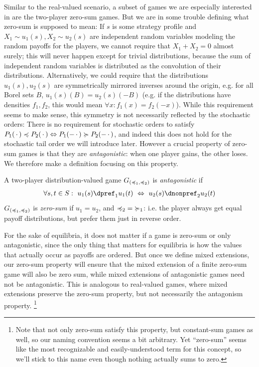 \documentclass[a4paper]{scrreprt}
\begin{document}
    Similar to the real-valued scenario, a subset of games we are especially interested in are the two-player zero-sum games.
    But we are in some trouble defining what zero-sum is supposed to mean: If $s$ is some strategy profile and $X_1 \sim u_1(s), X_2 \sim u_2(s)$ are independent random variables modeling the random payoffs for the players, we cannot require that $X_1 + X_2 = 0$ almost surely; this will never happen except for trivial distributions, because the sum of independent random variables is distributed as the convolution of their distributions.
    Alternatively, we could require that the distributions $u_1(s), u_2(s)$ are symmetrically mirrored inverses around the origin, e.g. for all Borel sets $B$, $u_1(s)(B) = u_2(s)(-B)$ (e.g. 
    if the distributions have densities $f_1, f_2$, this would mean $\forall x: f_1(x) = f_2(-x)$).
    While this requirement seems to make sense, this symmetry is not necessarily reflected by the stochastic orders: There is no requirement for stochastic orders to satisfy $P_1(\,\cdot\,) \preccurlyeq P_2(\,\cdot\,) \Leftrightarrow P_1(-\,\cdot\,) \succcurlyeq P_2(-\,\cdot\,)$, and indeed this does not hold for the stochastic tail order we will introduce later.
    However a crucial property of zero-sum games is that they are \emph{antagonistic}: 
    when one player gains, the other loses. We therefore make a definition focusing on this property.
    \begin{defn}
        A two-player distribution-valued game $G_{(\preccurlyeq_1, \preccurlyeq_2)}$ is \emph{antagonistic} if
        \begin{gather*}
            \forall s, t \in S:~ u_1(s) \dpref_1 u_1(t) ~\lra~ u_2(s) \dnonpref_2 u_2(t)
        \end{gather*}
        $G_{(\preccurlyeq_1, \preccurlyeq_2)}$ is \emph{zero-sum} if $u_1 = u_2$, and $\preccurlyeq_2 {=} \succcurlyeq_1$: i.e. the player always get equal payoff distributions, but prefer them just in reverse order.
    \end{defn}

    For the sake of equilibria, it does not matter if a game is zero-sum or only antagonistic, since the only thing that matters for equilibria is how the values that actually occur as payoffs are ordered. But once we define mixed extensions, our zero-sum property will ensure that the mixed extension of a finite zero-sum game will also be zero sum, while mixed extensions of antagonistic games need not be antagonistic. This is analogous to real-valued games, where mixed extensions preserve the zero-sum property, but not necessarily the antagonism property.
    \footnote{Note that not only zero-sum satisfy this property, but constant-sum games as well, so our naming convention seems a bit arbitrary.
    Yet “zero-sum” seems like the most recognizable and easily-understood term for this concept, so we'll stick to this name even though nothing actually sums to zero.}
    
\end{document}

